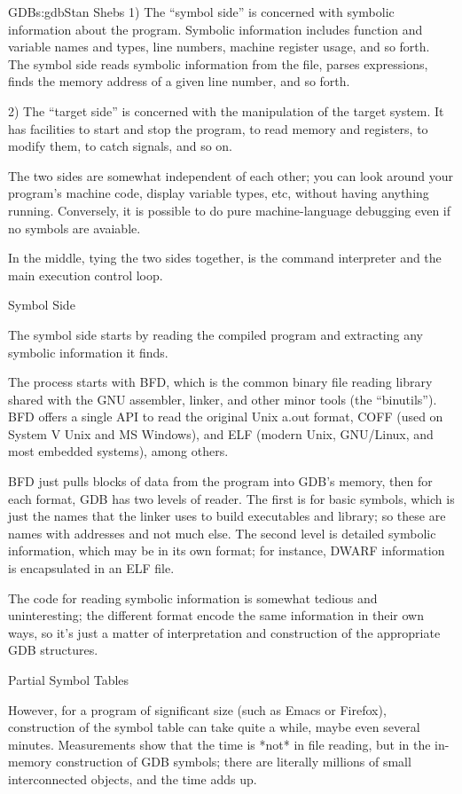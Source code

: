 \begin{aosachapter}{GDB}{s:gdb}{Stan Shebs}
1) The ``symbol side'' is concerned with symbolic information about
the program.  Symbolic information includes function and variable
names and types, line numbers, machine register usage, and so forth.
The symbol side reads symbolic information from the file, parses
expressions, finds the memory address of a given line number, and so
forth.

2) The ``target side'' is concerned with the manipulation of the
target system.  It has facilities to start and stop the program, to
read memory and registers, to modify them, to catch signals, and so
on.

The two sides are somewhat independent of each other; you can look
around your program's machine code, display variable types, etc,
without having anything running.  Conversely, it is possible to do
pure machine-language debugging even if no symbols are avaiable.

In the middle, tying the two sides together, is the command interpreter
and the main execution control loop.

Symbol Side

The symbol side starts by reading the compiled program and extracting
any symbolic information it finds.

The process starts with BFD, which is the common binary file reading
library shared with the GNU assembler, linker, and other minor tools
(the ``binutils'').  BFD offers a single API to read the original Unix
a.out format, COFF (used on System V Unix and MS Windows), and ELF
(modern Unix, GNU/Linux, and most embedded systems), among others.

BFD just pulls blocks of data from the program into GDB's memory, then
for each format, GDB has two levels of reader.  The first is for basic
symbols, which is just the names that the linker uses to build
executables and library; so these are names with addresses and not
much else.  The second level is detailed symbolic information, which
may be in its own format; for instance, DWARF information is
encapsulated in an ELF file.

The code for reading symbolic information is somewhat tedious and
uninteresting; the different format encode the same information in
their own ways, so it's just a matter of interpretation and construction
of the appropriate GDB structures.

Partial Symbol Tables

However, for a program of significant size (such as Emacs or Firefox),
construction of the symbol table can take quite a while, maybe even
several minutes.  Measurements show that the time is *not* in file
reading, but in the in-memory construction of GDB symbols; there are
literally millions of small interconnected objects, and the time adds
up.


\end{aosachapter}
